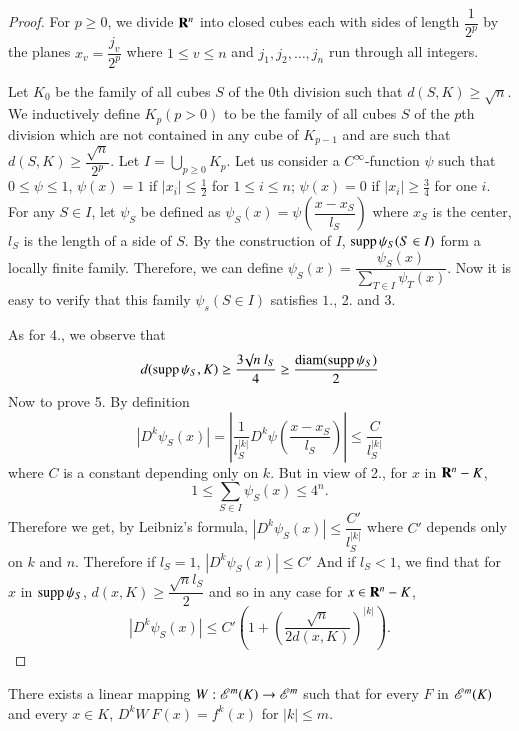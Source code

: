 \begin{proof}
For $p\geq 0$, we divide $\mathbf{R}^{n}$ into closed cubes each with sides of length $\dfrac{1}{2^{p}}$ by the planes $x_{v}=\dfrac{j_{v}}{2^{p}}$ where $1\leq v\leq n$ and $j_{1},j_{2},\ldots, j_{n}$ run through all integers.

Let $K_{0}$ be the family of all cubes $S$ of the 0th division such that $d(S,K)\geq \surd n$. We inductively define $K_{p}(p>0)$ to be the family of all cubes $S$ of the $p$th division which are not contained in any cube of $K_{p-1}$ and are such that $d(S,K)\geq \dfrac{\surd n}{2^{p}}$. Let $I=\bigcup\limits_{p\geq 0}K_{p}$. Let us consider a $C^{\infty}$-function $\psi$ such that $0\leq \psi \leq 1$, $\psi(x)=1$ if $|x_{i}|\leq \frac{1}{2}$ for $1\leq i\leq n$; $\psi(x)=0$ if $|x_{i}|\geq \frac{3}{4}$ for one $i$. For any $S\in I$, let $\psi_{S}$ be defined as $\psi_{S}(x)=\psi\left(\dfrac{x-x_{S}}{l_{S}}\right)$ where $x_{S}$ is the center, $l_{S}$ is the length of a side of $S$. By the construction of $I$, $\operatorname{supp} \psi_{S}(S\in I)$ form a locally finite family. Therefore, we can define $\psi_{S}(x)=\dfrac{\psi_{S}(x)}{\sum\limits_{T\in I}\psi_{T}(x)}$. Now it is easy to verify that this family $\psi_{s}(S\in I)$ satisfies $1$., 2. and 3.

As for 4., we observe that
$$
d(\operatorname{supp} \psi_{S},K)\geq \dfrac{3\surd n \ l_{S}}{4}\geq \dfrac{\operatorname{diam} (\operatorname{supp} \psi_{S})}{2}
$$
Now to prove 5. By definition
$$
|D^{k}\psi_{S}(x)|=\left|\dfrac{1}{l^{|k|}_{S}}D^{k}\psi\left(\dfrac{x-x_{S}}{l_{S}}\right)\right|\leq \dfrac{C}{l^{|k|}_{S}}
$$\pageoriginale
where $C$ is a constant depending only on $k$. But in view of 2., for $x$ in $\mathbf{R}^{n}-K$,
$$
1\leq \sum\limits_{S\in I}\psi_{S}(x)\leq 4^{n}.
$$
Therefore we get, by Leibniz's formula, $|D^{k}\psi_{S}(x)|\leq \dfrac{C'}{l^{|k|}_{S}}$ where $C'$ depends only on $k$ and $n$. Therefore if $l_{S}=1$, $|D^{k}\psi_{S}(x)|\leq C'$ And if $l_{S}<1$, we find that for $x$ in $\operatorname{supp}\psi_{S}$, $d(x,K)\geq \dfrac{\surd nl_{S}}{2}$ and so in any case for $x\in \mathbf{R}^{n}-K$,
$$
\left|D^{k}\psi_{S}(x)\right|\leq C'\left(1+\left(\dfrac{\surd n}{2d(x,K)}\right)^{|k|}\right).
$$
\end{proof}

\begin{theorem}\label{chap1-thm3.2}
There exists a linear mapping $W:\mathscr{E}^{m}(K)\to \mathscr{E}^{m}$ such that for every $F$ in $\mathscr{E}^{m}(K)$ and every $x\in K$, $D^{k}W \ F(x)=f^{k}(x)$ for $|k|\leq m$.
\end{theorem}

